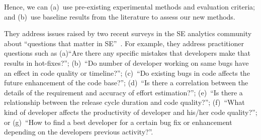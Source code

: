 Hence, we can (a)~use pre-existing experimental methods and evaluation criteria; and (b)~use  baseline results  from the literature to 
assess   our new methods. 
\item
They address
issues raised by two recent surveys in the SE analytics community
about  ``questions that matter in SE''~\cite{Begel:2014,gupta2015identifying}.
For example, they address practitioner questions such as (a)``Are there any specific mistakes that developers make that results in hot-fixes?''; (b)~``Do number of developer working on same bugs have an effect in code quality or timeline?'';
(c)~``Do existing bugs in code affects the future enhancement of the code base?'';
(d)~``Is there a  correlation between the details of the requirement and accuracy of effort estimation?'';
(e)~``Is there a relationship between the release cycle duration and code quality?''; (f)~``What kind of developer affects the productivity of developer and his/her code quality?'';
or (g)~``How to find a best developer for a certain bug fix or enhancement depending on the developers previous activity?''.
\ei
